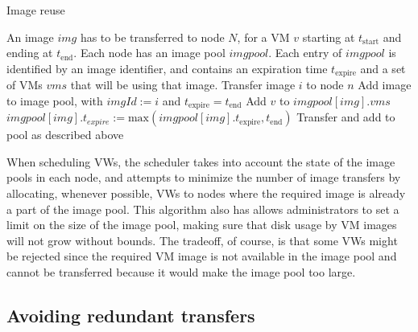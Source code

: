 \begin{algorithm}
\caption{Image reuse}
\label{alg:reuse}
\begin{algorithmic}
\REQUIRE An image $img$ has to be transferred to node $N$, for a VM $v$ starting at $t_\textrm{start}$ and ending at $t_\textrm{end}$. Each node has an image pool $imgpool$. Each entry of $imgpool$ is identified by an image identifier, and contains an expiration time $t_\textrm{expire}$ and a set of VMs $vms$ that will be using that image. 
\STATE
{}
\STATE Transfer image $i$ to node $n$
\STATE Add image to image pool, with $imgId:=i$ and $t_\textrm{expire}=t_\textrm{end}$ 
\ELSE
{}
\STATE {}
\STATE Add $v$ to $imgpool[img].vms$
\STATE $imgpool[img].t_{expire}:=\textrm{max}(imgpool[img].t_\textrm{expire},t_\textrm{end})$
\ELSE
\STATE Transfer and add to pool as described above
\ENDIF
\ENDIF
\end{algorithmic}
\end{algorithm}

When scheduling VWs, the scheduler takes into account the state of the image pools in each node, and attempts to minimize the number of image transfers by allocating, whenever possible, VWs to nodes where the required image is already a part of the image pool. This algorithm also has allows administrators to set a limit on the size of the image pool, making sure that disk usage by VM images will not grow without bounds. The tradeoff, of course, is that some VWs might be rejected since the required VM image is not available in the image pool and cannot be transferred because it would make the image pool too large.



\subsection{Avoiding redundant transfers}

